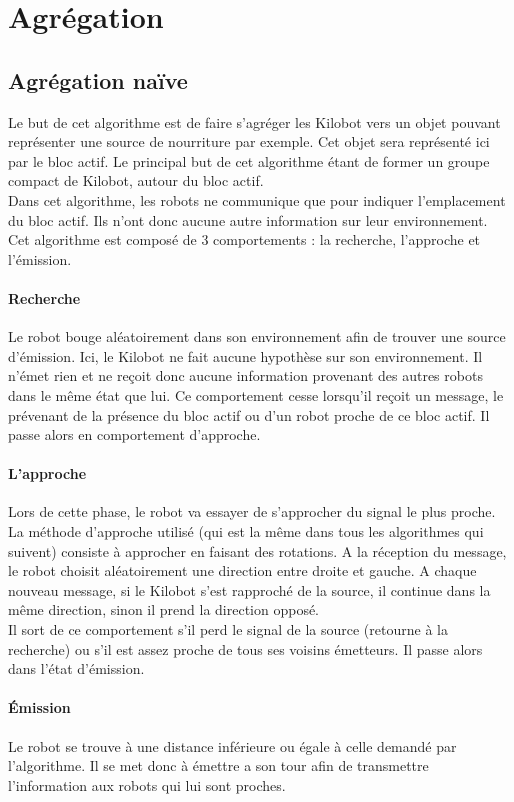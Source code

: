 \documentclass[a4paper]{article}
\begin{document}
\section{Agrégation}
\subsection{Agrégation naïve}
Le but de cet algorithme est de faire s'agréger les Kilobot vers un objet  pouvant représenter une source de nourriture par exemple. Cet objet sera représenté ici par le bloc actif. Le principal but de cet algorithme étant de former un groupe compact de Kilobot, autour du bloc actif.\\
Dans cet algorithme, les robots ne communique que pour indiquer l'emplacement du bloc actif. Ils n'ont donc aucune autre information sur leur environnement. Cet algorithme est composé de 3 comportements : la recherche, l'approche et l'émission.\\
\paragraph{Recherche} Le robot bouge aléatoirement dans son environnement afin de trouver une source d'émission. Ici, le Kilobot ne fait aucune hypothèse sur son environnement. Il n'émet rien et ne reçoit donc aucune information provenant des autres robots dans le même état que lui. Ce comportement cesse lorsqu'il reçoit un message, le prévenant de la présence du bloc actif ou d'un robot proche de ce bloc actif. Il passe alors en comportement d'approche.
\paragraph{L'approche} Lors de cette phase, le robot va essayer de s'approcher du signal le plus proche. La méthode d'approche utilisé (qui est la même dans tous les algorithmes qui suivent) consiste à approcher en faisant des rotations. A la réception du message, le robot choisit aléatoirement une direction entre droite et gauche. A chaque nouveau message, si le Kilobot s'est rapproché de la source, il continue dans la même direction, sinon il prend la direction opposé.\\Il sort de ce comportement s'il perd le signal de la source (retourne à la recherche) ou s'il est assez proche de tous ses voisins émetteurs. Il passe alors dans l'état d'émission.
\paragraph{Émission} Le robot se trouve à une distance inférieure ou égale à celle demandé par l'algorithme. Il se met donc à émettre a son tour afin de transmettre l'information aux robots qui lui sont proches.
\end{document}
